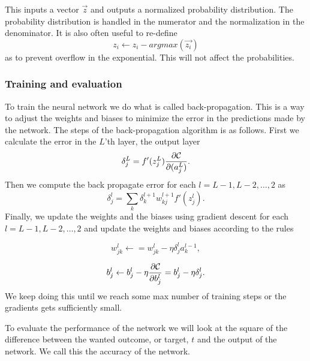 This inputs a vector $\vec{z}$ and outputs a normalized probability
distribution. The probability distribution is handled in the numerator and the
normalization in the denominator. It is also often useful to re-define
\begin{equation*}
    z_i \gets z_i - argmax(\vec{z_i})
\end{equation*}
as to prevent overflow in the exponential. This will not affect the
probabilities. 

\subsubsection{Training and evaluation}
To train the neural network we do what is called back-propagation. This is a
way to adjust the weights and biases to minimize the error in the predictions
made by the network. The steps of the back-propagation algorithm is as follows.
First we calculate the error in the $L$'th layer, the output layer
\begin{equation*}
    \delta_j^L = f'(z_j^L)\frac{\partial {\cal C}}{\partial (a_j^L)}.
\end{equation*}
Then we compute the back propagate error for each $l=L-1,L-2,\dots,2$ as
\begin{equation*}
    \delta_j^l = \sum_k \delta_k^{l+1}w_{kj}^{l+1}f'(z_j^l).
\end{equation*}
Finally, we update the weights and the biases using gradient descent for each
$l=L-1,L-2,\dots,2$ and update the weights and biases according to the rules

$$
w_{jk}^l\leftarrow  = w_{jk}^l- \eta \delta_j^la_k^{l-1},
$$

$$
b_j^l \leftarrow b_j^l-\eta \frac{\partial {\cal C}}{\partial b_j^l}=b_j^l-\eta
\delta_j^l.
$$
We keep doing this until we reach some max number of training steps or the
gradients gets sufficiently small.

To evaluate the performance of the network we will look at the square of the
difference between the wanted outcome, or target, $t$ and the output of the
network. We call this the accuracy of the network.
